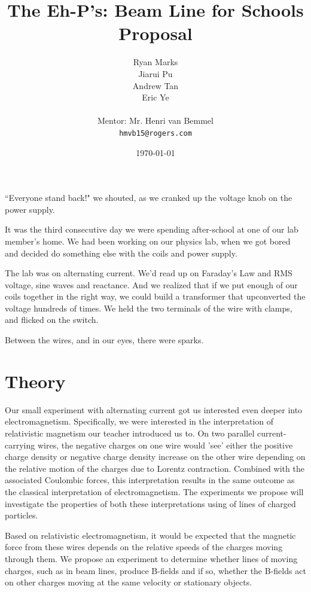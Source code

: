 \documentclass[12pt,letterpaper]{article}
\begin{document}
\title{The Eh-P's: Beam Line for Schools Proposal}
\author{
Ryan Marks\\
Jiarui Pu \\ 
Andrew Tan\\
Eric Ye\\
\\
Mentor: Mr. Henri van Bemmel\\
\normalsize{\texttt{hmvb15@rogers.com}}
}

\date{\today}
\maketitle

``Everyone stand back!" we shouted, as we cranked up the voltage knob on the power supply.

It was the third consecutive day we were spending after-school at one of our lab member’s home. We had been working on our physics lab, when we got bored and decided do something else with the coils and power supply.

The lab was on alternating current. We’d read up on Faraday’s Law and RMS voltage, sine waves and reactance. And we realized that if we put enough of our coils together in the right way, we could build a transformer that upconverted the voltage hundreds of times. We held the two terminals of the wire with clamps, and flicked on the switch.

Between the wires, and in our eyes, there were sparks. 

\section{Theory}
Our small experiment with alternating current got us interested even deeper into electromagnetism. Specifically, we were interested in the interpretation of relativistic magnetism our teacher introduced us to. On two parallel current-carrying wires, the negative charges on one wire would 'see' either the positive charge density or negative charge density increase on the other wire depending on the relative motion of the charges due to Lorentz contraction. Combined with the associated Coulombic forces, this interpretation results in the same outcome as the classical interpretation of electromagnetism. The experiments we propose will investigate the properties of both these interpretations using of lines of charged particles.

Based on relativistic electromagnetism, it would be expected that the magnetic force from these wires depends on the relative speeds of the charges moving through them. We propose an experiment to determine whether lines of moving charges, such as in beam lines, produce B-fields and if so, whether the B-fields act on other charges moving at the same velocity or stationary objects.
\end{document}
